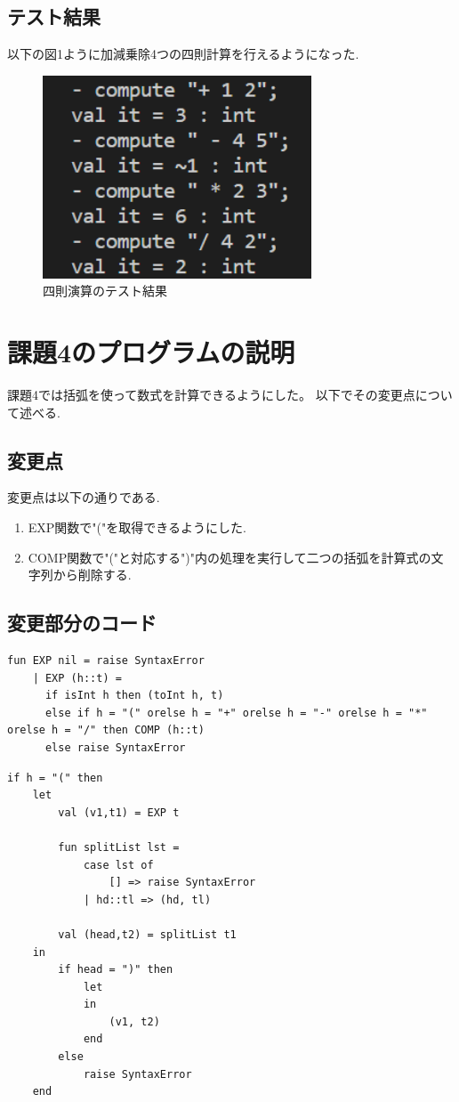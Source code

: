 \documentclass[dvipdfmx]{jarticle}
\begin{document}
\subsection{テスト結果}
以下の図1ように加減乗除4つの四則計算を行えるようになった.
\begin{figure}[h]
    \centering
    \includegraphics[width=8cm]{test2.png}
    \caption{四則演算のテスト結果}
\end{figure}




\section{課題4のプログラムの説明}
課題4では括弧を使って数式を計算できるようにした。
以下でその変更点について述べる.
\subsection{変更点}
変更点は以下の通りである.
\begin{enumerate}
    \item EXP関数で"("を取得できるようにした.
    \item COMP関数で"("と対応する")"内の処理を実行して二つの括弧を計算式の文字列から削除する.
\end{enumerate}
\subsection{変更部分のコード}
\begin{lstlisting}[caption=EXP関数の一部,label=fuga]
    fun EXP nil = raise SyntaxError
    | EXP (h::t) =
      if isInt h then (toInt h, t)
      else if h = "(" orelse h = "+" orelse h = "-" orelse h = "*" orelse h = "/" then COMP (h::t)
      else raise SyntaxError
\end{lstlisting}
\begin{lstlisting}[caption=COMPに新たに追加した分岐,label=fuga]
    if h = "(" then
    let
        val (v1,t1) = EXP t

        fun splitList lst =
            case lst of
                [] => raise SyntaxError
            | hd::tl => (hd, tl)

        val (head,t2) = splitList t1
    in
        if head = ")" then
            let
            in
                (v1, t2)
            end
        else
            raise SyntaxError
    end
\end{lstlisting}
\end{document}

